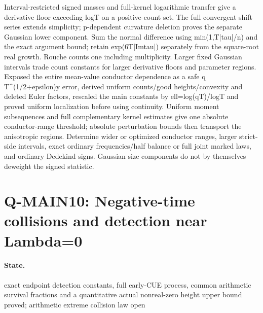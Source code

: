 Interval-restricted signed masses and full-kernel logarithmic transfer give a derivative floor exceeding logT on a positive-count set. The full convergent shift series extends simplicity; p-dependent curvature deletion proves the separate Gaussian lower component. Sum the normal difference using min(1,T|tau|/n) and the exact argument bound; retain exp(6T|Imtau|) separately from the square-root real growth. Rouche counts one including multiplicity. Larger fixed Gaussian intervals trade count constants for larger derivative floors and parameter regions. Exposed the entire mean-value conductor dependence as a safe q T\textasciicircum{}(1/2+epsilon)y error, derived uniform counts/good heights/convexity and deleted Euler factors, rescaled the main constants by ell=log(qT)/logT and proved uniform localization before using continuity. Uniform moment subsequences and full complementary kernel estimates give one absolute conductor-range threshold; absolute perturbation bounds then transport the anisotropic regions. Determine wider or optimized conductor ranges, larger strict-side intervals, exact ordinary frequencies/half balance or full joint marked laws, and ordinary Dedekind signs. Gaussian size components do not by themselves deweight the signed statistic.

\section{Q-MAIN10: Negative-time collisions and detection near Lambda=0}
\paragraph{State.} exact endpoint detection constants, full early-CUE process, common arithmetic survival fractions and a quantitative actual nonreal-zero height upper bound proved; arithmetic extreme collision law open
